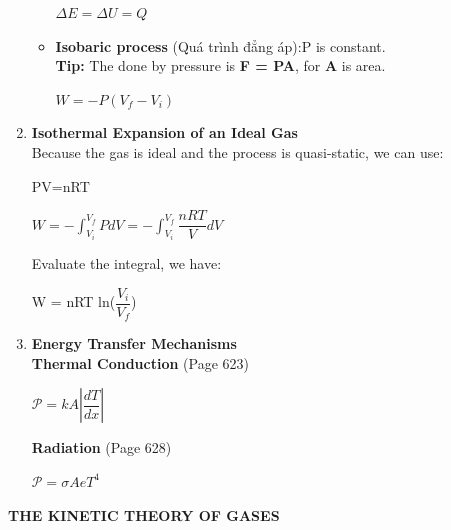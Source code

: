 \documentclass[10pt]{article}
\begin{document}
\begin{enumerate}
\begin{itemize}
\begin{mybox}
\begin{center}
		$\Delta E = \Delta U = Q$
		\end{center}
		\end{mybox}
		\item \textbf{Isobaric process} (Quá trình đẳng áp):P is constant.\\
		\textbf{Tip:} The done by pressure is \textbf{F = PA}, for \textbf{A} is area.
		\begin{mybox}
		\begin{center}
		$W = -P(V_f-V_i)$
		\end{center}
		\end{mybox}
	\end{itemize}
	\item \textbf{Isothermal Expansion of an Ideal Gas}\\
	Because the gas is ideal and the process is quasi-static, we can use: 
	\begin{mybox}
	\begin{center}
	PV=nRT
	\end{center}
	\end{mybox}
	\begin{center}
	$W = - \displaystyle \int_{V_i}^{V_f}PdV = - \int_{V_i}^{V_f} \dfrac{nRT}{V}dV$
	\end{center}
	Evaluate the integral, we have:
	\begin{mybox}
	\begin{center}
	W = nRT ln($\dfrac{V_i}{V_f}$)
	\end{center}
	\end{mybox}
	\item \textbf{Energy Transfer Mechanisms}\\
	\textbf{Thermal Conduction} (Page 623)\\
	\begin{mybox}
	\begin{center}
	$\mathcal{P} = kA \displaystyle | \dfrac{dT}{dx} |$
	\end{center}
	\end{mybox}
	\textbf{Radiation} (Page 628)\\
	\begin{mybox}
	\begin{center}
	$\mathcal{P} = \sigma AeT^4$
	\end{center}
	\end{mybox}
\end{enumerate}
\pagebreak
\begin{center}
\textbf{THE KINETIC THEORY OF GASES}
\end{center}
\end{document}

